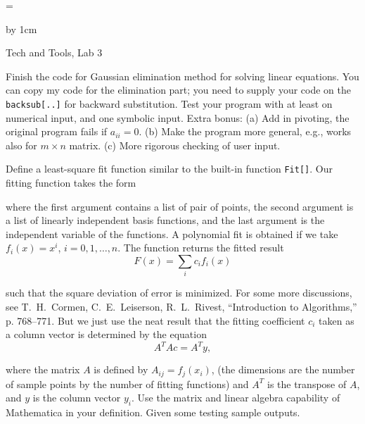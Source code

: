 \magnification=\magstephalf

\advance\vsize by 1cm
\nopagenumbers
\centerline{\titlefont Tech and Tools, Lab 3}
\problem Finish the code for Gaussian elimination method for solving
linear equations.  You can copy my code for the elimination part; 
you need to supply your code on the {\tt backsub[..]} for backward 
substitution.  Test your program with at least on numerical input, and
one symbolic input. Extra bonus: (a) Add in pivoting, the original program fails if
 $a_{ii} = 0$. (b) Make the program more general, e.g., works also for
$m \times n$ matrix. (c) More rigorous checking of user input.  

\problem Define a least-square fit function similar to the built-in
function {\tt Fit[]}.  Our fitting function takes the form\par
{}
\item{} where the first argument contains a list of pair of points,
the second argument is a list of linearly independent basis 
functions, and the last argument is the independent variable of the functions. 
A polynomial fit is obtained if we take $f_i(x) = x^i$, $i = 0, 1, \ldots, n$.
The function returns the fitted result
$$F(x) = \sum_i c_i f_i(x)$$
\item{} such that the square deviation of error is minimized.  For some more
discussions, see T.~H.~Cormen, C.~E.~Leiserson, R.~L.~Rivest, ``Introduction
to Algorithms,'' p. 768--771.  But we just use the neat result
that the fitting coefficient $c_i$ taken as a column vector
is determined by the equation
$$ A^{T}A c = A^{T} y, $$
\item{} where the matrix $A$ is defined by $A_{ij} = f_j(x_i)$, 
(the dimensions are the number of sample points by the number of 
fitting functions) and $A^{T}$ is the
transpose of $A$, and $y$ is the column vector $y_i$.   Use the matrix
and linear algebra capability of Mathematica in your definition.
Given some testing sample outputs.

